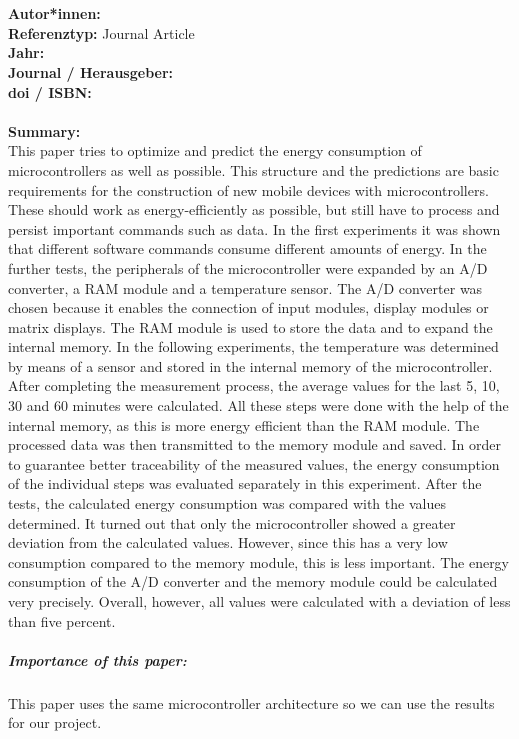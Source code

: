 \documentclass{report}
\newcommand{\createJournalArticleHeader}[1]{
    {\let\clearpage\relax \chapter{\citetitle{#1}}}
    \noindent
    \textbf{Autor*innen:} \citeauthor{#1} \\
    \textbf{Referenztyp:} Journal Article\\
    \textbf{Jahr:} \citeyear{#1} \\
    \textbf{Journal / Herausgeber:} \citefield{#1}{journaltitle}\\
    \textbf{doi / ISBN:} \citefield{#1}{doi} \\\\
    \textbf{Summary:}\\
}
\begin{document}
\createJournalArticleHeader{konstantakos_energy_2008}
This paper tries to optimize and predict the energy consumption of microcontrollers as well as possible. This structure and the predictions are basic requirements for the construction of new mobile devices with microcontrollers. These should work as energy-efficiently as possible, but still have to process and persist important commands such as data. In the first experiments it was shown that different software commands consume different amounts of energy. In the further tests, the peripherals of the microcontroller were expanded by an A/D converter, a RAM module and a temperature sensor. The A/D converter was chosen because it enables the connection of input modules, display modules or matrix displays. The RAM module is used to store the data and to expand the internal memory. In the following experiments, the temperature was determined by means of a sensor and stored in the internal memory of the microcontroller. After completing the measurement process, the average values for the last 5, 10, 30 and 60 minutes were calculated. All these steps were done with the help of the internal memory, as this is more energy efficient than the RAM module. The processed data was then transmitted to the memory module and saved. In order to guarantee better traceability of the measured values, the energy consumption of the individual steps was evaluated separately in this experiment.\linebreak
After the tests, the calculated energy consumption was compared with the values determined. It turned out that only the microcontroller showed a greater deviation from the calculated values. However, since this has a very low consumption compared to the memory module, this is less important. The energy consumption of the A/D converter and the memory module could be calculated very precisely. Overall, however, all values were calculated with a deviation of less than five percent.
\\
\paragraph{Importance of this paper:}
This paper uses the same microcontroller architecture so we can use the results for our project.
	
	
\end{document}
